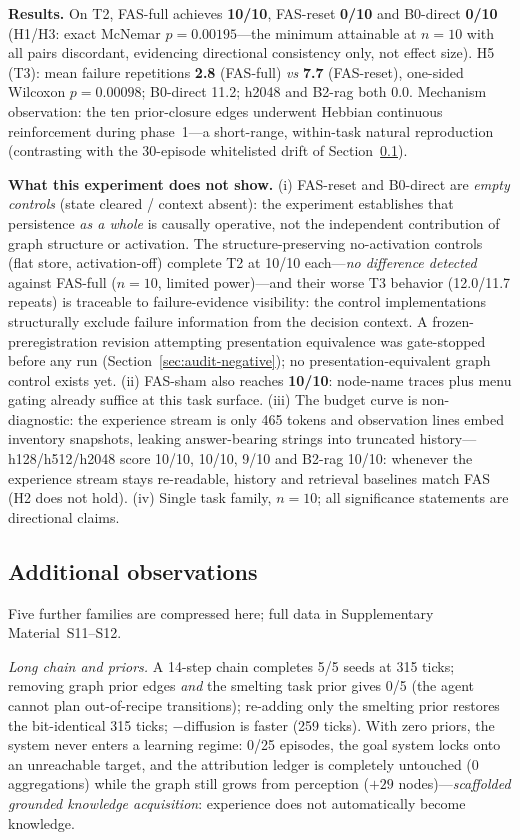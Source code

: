 \documentclass[10pt]{article}
\begin{document}
\textbf{Results.} On T2, FAS-full achieves \textbf{10/10}, FAS-reset
\textbf{0/10} and B0-direct \textbf{0/10} (H1/H3: exact McNemar
$p{=}0.00195$---the minimum attainable at $n{=}10$ with all pairs
discordant, evidencing directional consistency only, not effect size).
H5 (T3): mean failure repetitions \textbf{2.8} (FAS-full) \emph{vs}
\textbf{7.7} (FAS-reset), one-sided Wilcoxon $p{=}0.00098$;
B0-direct 11.2; h2048 and B2-rag both 0.0. Mechanism observation: the
ten prior-closure edges underwent Hebbian continuous reinforcement
during phase~1---a short-range, within-task natural reproduction
(contrasting with the 30-episode whitelisted drift of
Section~\ref{sec:res-system}).

\textbf{What this experiment does not show.} (i) FAS-reset and
B0-direct are \emph{empty controls} (state cleared / context absent):
the experiment establishes that persistence \emph{as a whole} is
causally operative, not the independent contribution of graph
structure or activation. The structure-preserving no-activation
controls (flat store, activation-off) complete T2 at 10/10
each---\emph{no difference detected} against FAS-full ($n{=}10$,
limited power)---and their worse T3 behavior (12.0/11.7 repeats) is
traceable to failure-evidence visibility: the control implementations
structurally exclude failure information from the decision context.
A frozen-preregistration revision attempting presentation equivalence
was gate-stopped before any run (Section~\ref{sec:audit-negative}); no
presentation-equivalent graph control exists yet. (ii) FAS-sham also reaches
\textbf{10/10}: node-name traces plus menu gating already suffice at
this task surface. (iii) The budget curve is non-diagnostic: the
experience stream is only 465 tokens and observation lines embed
inventory snapshots, leaking answer-bearing strings into truncated
history---h128/h512/h2048 score 10/10, 10/10, 9/10 and B2-rag 10/10:
whenever the experience stream stays re-readable, history and
retrieval baselines match FAS (H2 does not hold). (iv) Single task
family, $n{=}10$; all significance statements are directional claims.

\subsection{Additional observations}
\label{sec:res-system}
Five further families are compressed here; full data in Supplementary Material~S11--S12.

\emph{Long chain and priors.} A 14-step chain completes 5/5 seeds at 315 ticks; removing graph prior edges \emph{and} the smelting task prior gives 0/5 (the agent cannot plan out-of-recipe transitions); re-adding only the smelting prior restores the bit-identical 315 ticks; $-$diffusion is faster (259 ticks). With zero priors, the system never enters a learning regime: 0/25 episodes, the goal system locks onto an unreachable target, and the attribution ledger is completely untouched (0 aggregations) while the graph still grows from perception ($+29$ nodes)---\emph{scaffolded grounded knowledge acquisition}: experience does not automatically become knowledge.
\end{document}
